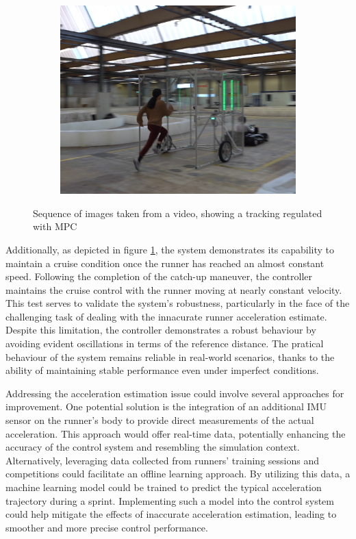 \documentclass[a4paper,12pt,oneside]{book}
\begin{document}
\begin{figure}[h!]
\begin{subfigure}[b]{0.32\textwidth}
        \includegraphics[width=\textwidth]{SteadyState/ss9.png}
    \end{subfigure}
    \caption{Sequence of images taken from a video, showing a tracking regulated with MPC }
\label{MPC_hard_img2}
\end{figure}

\bigskip
Additionally, as depicted in figure \ref{MPC_hard_img2}, the system demonstrates its capability to maintain a cruise condition once the runner has reached an almost constant speed.
Following the completion of the catch-up maneuver, the controller maintains the cruise control with the runner moving at nearly constant velocity.
This test serves to validate the system's robustness, particularly in the face of the challenging task of dealing with the innacurate runner acceleration estimate.
Despite this limitation, the controller demonstrates a robust behaviour by avoiding evident oscillations in terms of the reference distance.
The pratical behaviour of the system remains reliable in real-world scenarios, thanks to the ability of maintaining stable performance even under imperfect conditions.


\bigskip
Addressing the acceleration estimation issue could involve several approaches for improvement.
One potential solution is the integration of an additional IMU sensor on the runner's body to provide direct measurements of the actual acceleration. 
This approach would offer real-time data, potentially enhancing the accuracy of the control system and resembling the simulation context.
Alternatively, leveraging data collected from runners' training sessions and competitions could facilitate an offline learning approach.
By utilizing this data, a machine learning model could be trained to predict the typical acceleration trajectory during a sprint.
Implementing such a model into the control system could help mitigate the effects of inaccurate acceleration estimation, leading to smoother and more precise control performance.
\end{document}

